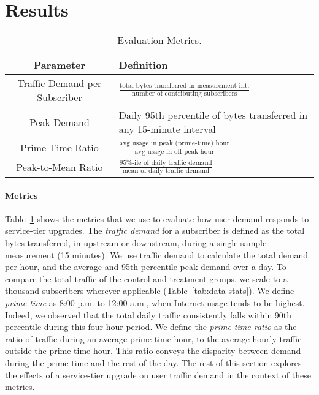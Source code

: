 \section{Results}\label{sec:analysis}

\begin{table}[t]
\begin{small}
\begin{tabular}{| c | p{1.6in} |}\hline
\textbf{Parameter} & \textbf{Definition}	\\\hline
Traffic Demand per Subscriber& \(\frac{\text{total bytes transferred in 
measurement int.}}{\text{number of contributing subscribers}}\)	\\
Peak Demand & Daily 95th percentile of bytes transferred in any 
15-minute interval \\ 
Prime-Time Ratio 	& \( \frac{ \text{avg usage in peak (prime-time) 
hour}}{ \text{avg usage in off-peak hour}}\) 		\\
Peak-to-Mean Ratio 		& \(\frac{\text{95\%-ile of daily traffic 
demand}}{\text{mean of daily traffic demand}}\)	\\\hline
\end{tabular}
\end{small}
\caption{Evaluation Metrics.}
\label{tab:eval-criteria}
\end{table}

\paragraph{Metrics}
Table~\ref{tab:eval-criteria} shows the metrics that we use to evaluate
how user demand responds to service-tier upgrades. The \emph{traffic
  demand} for a subscriber is defined as the total bytes transferred, in
upstream or downstream, during a single sample measurement (15 minutes).
We use traffic demand to calculate the total demand per hour, and the
average and 95th percentile peak demand over a day. To compare the total
traffic of the control and treatment groups, we scale to a thousand
subscribers wherever applicable (Table~\ref{tab:data-stats}).  We
define \emph{prime time} as 8:00 p.m. to 12:00 a.m., when Internet usage
tends to be highest.  Indeed, we
observed that the total daily traffic consistently falls within 90th percentile
during this four-hour period. We define the \emph{prime-time ratio} as
the ratio of traffic during an average prime-time hour, to the average
hourly traffic outside the prime-time hour.  This ratio conveys the
disparity between demand during the prime-time and the rest of the day.
The rest of this section explores the effects of a service-tier upgrade
on user traffic demand in the context of these metrics.









%